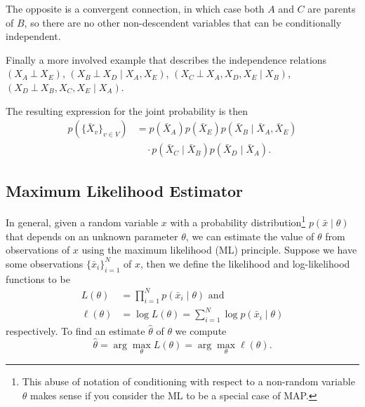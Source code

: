 \documentclass[a4paper]{article}
\newcommand{\given}{\mid}
\newcommand{\ind}{~\bot~} %
\theoremstyle{plain}
\theoremstyle{definition}
\theoremstyle{remark}
\begin{document}
The opposite is a convergent connection, in which case both $A$ and $C$ are
parents of $B$, so there are no other non-descendent variables that can be
conditionally independent.

\begin{center}
\end{center}

Finally a more involved example that describes the independence relations
$(X_A \ind X_E)$, $(X_B \ind X_D \given X_A, X_E)$, $(X_C \ind X_A, X_D, X_E
\given X_B)$, $(X_D \ind X_B, X_C, X_E \given X_A)$.

\begin{center}
\end{center}
The resulting expression for the joint probability is then
\begin{align*}
  p(\{\bar{X}_v\}_{v\in V}) &= 
    p(\bar{X}_A) p(\bar{X}_E) p(\bar{X}_B \given \bar{X}_A, \bar{X}_E) \\
    &\quad\cdot p(\bar{X}_C \given \bar{X}_B) p(\bar{X}_D \given \bar{X}_A).
\end{align*}

\subsection{Maximum Likelihood Estimator}

In general, given a random variable $x$ with a probability
distribution\footnote{This abuse of notation of conditioning with respect to a
non-random variable $\theta$ makes sense if you consider the ML to be a
special case of MAP.} $p(\bar{x} \given \theta)$ that depends on an unknown
parameter $\theta$, we can estimate the value of $\theta$ from observations of
$x$ using the maximum likelihood (ML) principle. Suppose we have some observations
$\{\bar{x}_i\}_{i=1}^N$ of $x$, then we define the likelihood and
log-likelihood functions to be
\begin{align*}
  L(\theta) &= \prod_{i=1}^N p(\bar{x}_i \given \theta) \text{ and}\\
  \ell(\theta) &= \log L(\theta) = \sum_{i=1}^N \log p(\bar{x}_i \given \theta)
\end{align*}
respectively. To find an estimate $\hat{\theta}$ of $\theta$ we compute
\[
  \hat{\theta} = \arg\max_\theta L(\theta) = \arg\max_\theta \ell(\theta).
\]
\end{document}
